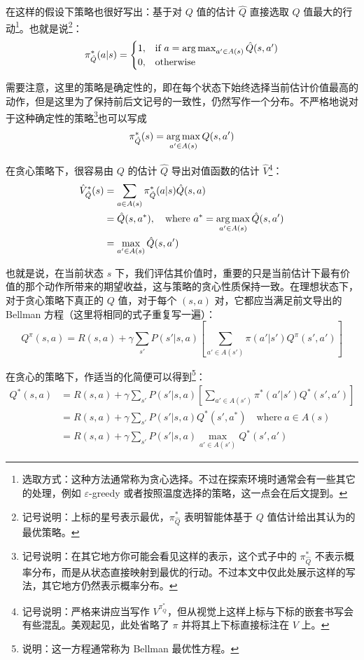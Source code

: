 在这样的假设下策略也很好写出：基于对 $Q$ 值的估计 $\hat Q$ 直接选取 $Q$ 值最大的行动\footnote{选取方式：这种方法通常称为贪心选择。不过在探索环境时通常会有一些其它的处理，例如 $\varepsilon$-greedy 或者按照温度选择的策略，这一点会在后文提到。}。也就是说\footnote{记号说明：上标的星号表示最优，$\pi^*_{\hat Q}$ 表明智能体基于 $Q$ 值估计给出其认为的最优策略。}：
\[
    \pi^*_{\hat Q} (a | s) = \begin{cases}
        1, & \text{if } a = \operatorname*{arg\,max}_{a' \in A(s)} \hat Q(s, a') \\
        0, & \text{otherwise}
    \end{cases}
\]

需要注意，这里的策略是确定性的，即在每个状态下始终选择当前估计价值最高的动作，但是这里为了保持前后文记号的一致性，仍然写作一个分布。不严格地说对于这种确定性的策略\footnote{记号说明：在其它地方你可能会看见这样的表示，这个式子中的 $\pi^*_{\hat Q}$ 不表示概率分布，而是从状态直接映射到最优的行动。不过本文中仅此处展示这样的写法，其它地方仍然表示概率分布。}也可以写成
\[
    \pi^*_{\hat Q} (s) = \operatorname*{arg\,max}_{a' \in A(s)} Q(s, a')
\]

在贪心策略下，很容易由 $Q$ 的估计 $\hat Q$ 导出对值函数的估计 $\hat V$\footnote{记号说明：严格来讲应当写作 $V^{\pi^*_{\hat Q}}$，但从视觉上这样上标与下标的嵌套书写会有些混乱。美观起见，此处省略了 $\pi$ 并将其上下标直接标注在 $V$ 上。}：
\[
    \begin{aligned}
        \hat V^*_{\hat Q} (s) & = \sum_{a \in A(s)} \pi^*_{\hat Q} (a | s) \hat Q(s, a)                         \\
                              & = \hat Q(s, a^*), \quad \text{where } a^* = \operatorname*{arg\,max}_{a' \in A(s)} \hat Q(s, a') \\
                              & = \max_{a' \in A(s)} \hat Q(s, a')
    \end{aligned}
\]

也就是说，在当前状态 $s$ 下，我们评估其价值时，重要的只是当前估计下最有价值的那个动作所带来的期望收益，这与策略的贪心性质保持一致。在理想状态下，对于贪心策略下真正的 $Q$ 值，对于每个 $(s, a)$ 对，它都应当满足前文导出的 Bellman 方程（这里将相同的式子重复写一遍）：
\[
    Q^\pi (s, a) = R(s, a) + \gamma \sum_{s'} P(s' | s, a) \left[\sum_{a' \in A(s')} \pi(a' | s') Q^\pi (s', a')\right]
\]

在贪心的策略下，作适当的化简便可以得到\footnote{说明：这一方程通常称为 Bellman 最优性方程。}：
\[
    \begin{aligned}
        Q^* (s, a) & = R(s, a) + \gamma \sum_{s'} P(s' | s, a) \left[
            \sum_{a' \in A(s')} \pi^* (a' | s') Q^* (s', a')
        \right]                                                                                               \\
                   & = R(s, a) + \gamma \sum_{s'} P(s' | s, a) Q^* (s', a^*) \quad \text{where} \; a \in A(s) \\
                   & = R(s, a) + \gamma \sum_{s'} P(s' | s, a) \max_{a' \in A(s')} Q^* (s', a')
    \end{aligned}
\]

